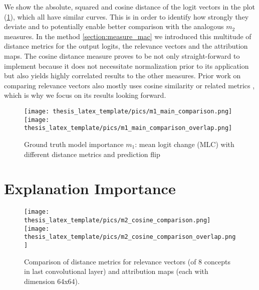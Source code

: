 We show the absolute, squared and cosine distance of the logit vectors in the plot (\cref{fig:m1_results}), which all have similar curves. This is in order to identify how strongly they deviate and to potentially enable better comparison with the analogous $m_2$ measures.
In the method \cref{section:measure_mac} we introduced this multitude of distance metrics for the output logits, the relevance vectors and the attribution maps. The cosine distance measure proves to be not only straight-forward to implement because it does not necessitate normalization prior to its application but also yields highly correlated results to the other measures. 
Prior work on comparing relevance vectors also mostly uses cosine similarity or related metrics \citep{Sixt2020, Achtibat2022,Achtibat2023, Dreyer2023a}, which is why we focus on its results looking forward.  

\begin{figure}[t!]
    \centering
    \texttt{[image: thesis\_latex\_template/pics/m1\_main\_comparison.png]}
    \texttt{[image: thesis\_latex\_template/pics/m1\_main\_comparison\_overlap.png]}
    \caption[Ground Truth Importance $m_1$]{Ground truth model importance $m_1$: mean logit change (MLC) with different distance metrics and prediction flip}
    \label{fig:m1_results}
\end{figure}

\section{Explanation Importance}

\begin{figure}[t!]
    \centering
    \texttt{[image: thesis\_latex\_template/pics/m2\_cosine\_comparison.png]}
    \texttt{[image: thesis\_latex\_template/pics/m2\_cosine\_comparison\_overlap.png]}
    \caption[Relevance Vectors and Attribution Maps, Comparison of Metrics]{Comparison of distance metrics for relevance vectors (of 8 concepts in last convolutional layer) and attribution maps (each with dimension 64x64).}
    \label{fig:m2_cosine_comparison}
\end{figure}


